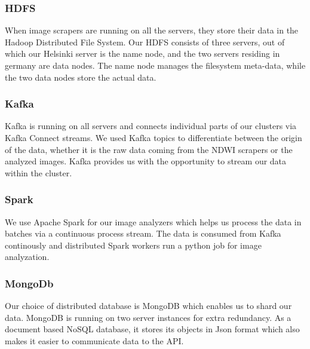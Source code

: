 \subsubsection{HDFS}
When image scrapers are running on all the servers, they store their data in the Hadoop Distributed File System. Our HDFS consists of three servers, out of which our Helsinki server is the name node, and the two servers residing in germany are data nodes.
The name node manages the filesystem meta-data, while the two data nodes store the actual data.

\subsubsection{Kafka}
Kafka is running on all servers and connects individual parts of our clusters via Kafka Connect streams. We used Kafka topics to differentiate between the origin of the data, whether it is the raw data coming from the NDWI scrapers or the analyzed images.
Kafka provides us with the opportunity to stream our data within the cluster.

\subsubsection{Spark}
We use Apache Spark for our image analyzers which helps us process the data in batches via a continuous process stream. The data is consumed from Kafka continously and distributed Spark workers run a python job for image analyzation.
\subsubsection{MongoDb}
Our choice of distributed database is MongoDB which enables us to shard our data. MongoDB is running on two server instances for extra redundancy. As a document based NoSQL database, it stores its objects in Json format which also makes it easier to communicate data to the API.

